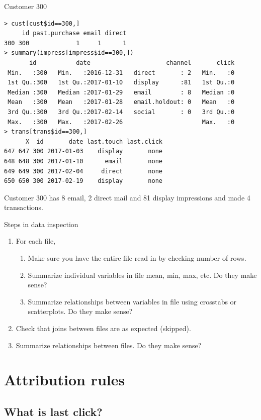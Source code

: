\documentclass[10pt, aspectratio=169]{beamer}
\begin{document}
\begin{frame}[fragile]{Customer 300}
\footnotesize
\begin{lstlisting}
> cust[cust$id==300,]
     id past.purchase email direct
300 300             1     1      1
> summary(impress[impress$id==300,])
       id           date                     channel       click  
 Min.   :300   Min.   :2016-12-31   direct       : 2   Min.   :0  
 1st Qu.:300   1st Qu.:2017-01-10   display      :81   1st Qu.:0  
 Median :300   Median :2017-01-29   email        : 8   Median :0  
 Mean   :300   Mean   :2017-01-28   email.holdout: 0   Mean   :0  
 3rd Qu.:300   3rd Qu.:2017-02-14   social       : 0   3rd Qu.:0  
 Max.   :300   Max.   :2017-02-26                      Max.   :0  
> trans[trans$id==300,]
      X  id       date last.touch last.click
647 647 300 2017-01-03    display       none
648 648 300 2017-01-10      email       none
649 649 300 2017-02-04     direct       none
650 650 300 2017-02-19    display       none
\end{lstlisting}
\alert{Customer 300 has 8 email, 2 direct mail and 81 display impressions and made 4 transactions.}
\end{frame}

\begin{frame}{Steps in data inspection}
\begin{enumerate}
\item For each file, 
\begin{enumerate}
\item Make sure you have the entire file read in by checking number of rows.
\item Summarize individual variables in file mean, min, max, etc.  Do they make sense?
\item Summarize relationships between variables in file using crosstabs or scatterplots.  Do they make sense?
\end{enumerate}
\item Check that joins between files are as expected (skipped).
\item Summarize relationships between files.  Do they make sense? 
\end{enumerate}
\end{frame}

\section{Attribution rules}

\subsection{What is last click?}
\end{document}
